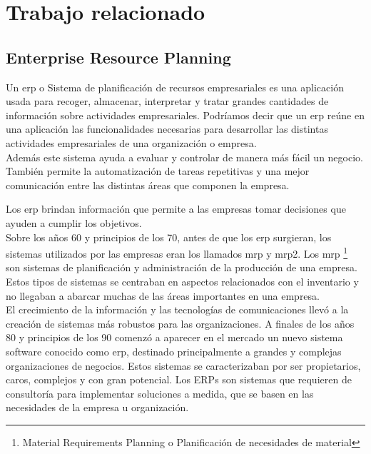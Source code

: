 \chapter{Trabajo relacionado}


\section[Enterprise Resource Planning]{Enterprise Resource Planning}

Un \acrfull{erp} o Sistema de planificación de recursos empresariales es una aplicación usada para recoger, almacenar,
interpretar y tratar grandes cantidades de información sobre actividades empresariales.
Podríamos decir que un \acrshort{erp} reúne en una aplicación las funcionalidades necesarias para desarrollar las distintas actividades empresariales de una organización o empresa.\\

Además este sistema ayuda a evaluar y controlar de manera más fácil un negocio. También permite la automatización de tareas repetitivas y una mejor comunicación entre las distintas áreas que componen la empresa.

Los \acrshort{erp} brindan información que permite a las empresas tomar decisiones que ayuden a cumplir los objetivos.\\

Sobre los años 60 y principios de los 70, antes de que los \acrshort{erp} surgieran, los sistemas utilizados por las empresas eran los llamados \acrshort{mrp} y \acrshort{mrp2}.
Los \acrshort{mrp} \footnote{Material Requirements Planning o Planificación de necesidades de material} son sistemas de planificación y administración de la producción de una empresa. Estos tipos de sistemas se centraban en aspectos relacionados con el inventario y no llegaban a abarcar muchas de las áreas importantes en una empresa.\\



El crecimiento de la información y las tecnologías de comunicaciones llevó a la creación de sistemas más robustos para 
las organizaciones. A finales de los años 80 y principios de los 90 comenzó a aparecer en el mercado un nuevo sistema 
software conocido como \acrshort{erp}, destinado principalmente a grandes y complejas organizaciones de negocios. Estos sistemas 
se caracterizaban por ser propietarios, caros, complejos y con gran potencial.
Los ERPs son sistemas que requieren de consultoría para implementar soluciones a medida, que se basen en las necesidades de la empresa u organización. \cite{erp1}

